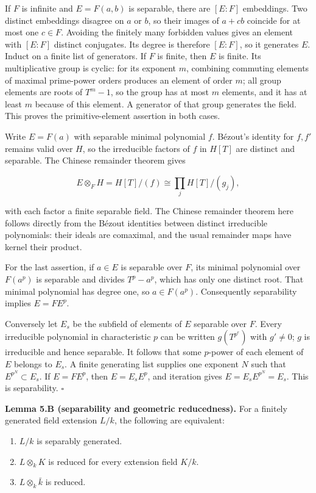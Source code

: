 \documentclass[
]{article}
\providecommand{\tightlist}{%
  \setlength{\itemsep}{0pt}\setlength{\parskip}{0pt}}
\begin{document}
If \(F\) is infinite and \(E=F(a,b)\) is separable, there are \([E:F]\)
embeddings. Two distinct embeddings disagree on \(a\) or \(b\), so their
images of \(a+cb\) coincide for at most one \(c\in F\). Avoiding the
finitely many forbidden values gives an element with \([E:F]\) distinct
conjugates. Its degree is therefore \([E:F]\), so it generates \(E\).
Induct on a finite list of generators. If \(F\) is finite, then \(E\) is
finite. Its multiplicative group is cyclic: for its exponent \(m\),
combining commuting elements of maximal prime-power orders produces an
element of order \(m\); all group elements are roots of \(T^m-1\), so
the group has at most \(m\) elements, and it has at least \(m\) because
of this element. A generator of that group generates the field. This
proves the primitive-element assertion in both cases.

Write \(E=F(a)\) with separable minimal polynomial \(f\). Bézout's
identity for \(f,f'\) remains valid over \(H\), so the irreducible
factors of \(f\) in \(H[T]\) are distinct and separable. The Chinese
remainder theorem gives

\[
E\otimes_F H=H[T]/(f)\cong\prod_j H[T]/(g_j),
\]

with each factor a finite separable field. The Chinese remainder theorem
here follows directly from the Bézout identities between distinct
irreducible polynomials: their ideals are comaximal, and the usual
remainder maps have kernel their product.

For the last assertion, if \(a\in E\) is separable over \(F\), its
minimal polynomial over \(F(a^p)\) is separable and divides \(T^p-a^p\),
which has only one distinct root. That minimal polynomial has degree
one, so \(a\in F(a^p)\). Consequently separability implies \(E=FE^p\).

Conversely let \(E_s\) be the subfield of elements of \(E\) separable
over \(F\). Every irreducible polynomial in characteristic \(p\) can be
written \(g(T^{p^e})\) with \(g'\ne0\); \(g\) is irreducible and hence
separable. It follows that some \(p\)-power of each element of \(E\)
belongs to \(E_s\). A finite generating list supplies one exponent \(N\)
such that \(E^{p^N}\subset E_s\). If \(E=FE^p\), then \(E=E_sE^p\), and
iteration gives \(E=E_sE^{p^N}=E_s\). This is separability. \(\square\)

\textbf{Lemma 5.B (separability and geometric reducedness).} For a
finitely generated field extension \(L/k\), the following are
equivalent:

\begin{enumerate}
\def\labelenumi{\arabic{enumi}.}
\tightlist
\item
  \(L/k\) is separably generated.
\item
  \(L\otimes_k K\) is reduced for every extension field \(K/k\).
\item
  \(L\otimes_k\bar k\) is reduced.
\end{enumerate}
\end{document}
